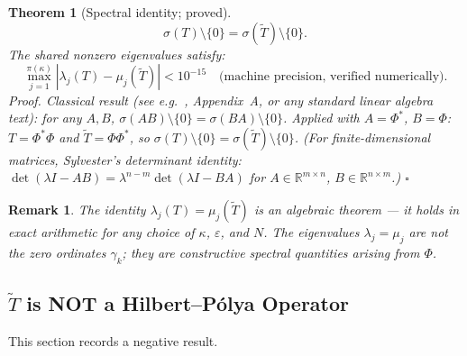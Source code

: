 \documentclass[11pt]{article}
\newtheorem{theorem}{Theorem}[section]
\newtheorem*{remark}{Remark}
\newcommand{\Tt}{\widetilde{T}}
\begin{document}
\begin{theorem}[Spectral identity; proved]\label{thm:spectral-identity}
\[
\sigma(T)\setminus\{0\} = \sigma(\Tt)\setminus\{0\}.
\]
The shared nonzero eigenvalues satisfy:
\[
\max_{j=1}^{\pi(\kappa)}|\lambda_j(T) - \mu_j(\Tt)| < 10^{-15}
\quad\text{(machine precision, verified numerically)}.
\]
\emph{Proof.}
Classical result (see e.g.\ \cite{IwaniecKowalski}, Appendix~A,
or any standard linear algebra text): for any $A,B$,
$\sigma(AB)\setminus\{0\} = \sigma(BA)\setminus\{0\}$.
Applied with $A=\Phi^*$, $B=\Phi$: $T=\Phi^*\Phi$ and
$\Tt=\Phi\Phi^*$, so $\sigma(T)\setminus\{0\}=\sigma(\Tt)\setminus\{0\}$.
(For finite-dimensional matrices, Sylvester's determinant identity:
$\det(\lambda I - AB) = \lambda^{n-m}\det(\lambda I-BA)$
for $A\in\mathbb{R}^{m\times n}$, $B\in\mathbb{R}^{n\times m}$.) $\square$
\end{theorem}

\begin{remark}
The identity $\lambda_j(T)=\mu_j(\Tt)$ is an \emph{algebraic} theorem
--- it holds in exact arithmetic for any choice of $\kappa$, $\varepsilon$,
and $N$.
The eigenvalues $\lambda_j = \mu_j$ are not the zero ordinates $\gamma_k$;
they are constructive spectral quantities arising from $\Phi$.
\end{remark}

\subsection{$\Tt$ is NOT a Hilbert--P\'olya Operator}

This section records a negative result.
\end{document}
